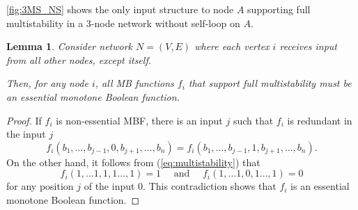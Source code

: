 \documentclass[12pt]{amsart}
\newtheorem{lem}[thm]{Lemma}
\theoremstyle{definition}
\begin{document}
\cref{fig:3MS_NS} shows the only input structure to node $A$ supporting full multistability in a 3-node network without self-loop on $A$.

\begin{lem}
    Consider network $N=(V,E)$ where each vertex $i$ receives input from all other nodes, except itself.
    
     Then, for any node $i$, all MB functions $f_i$ that support full multistability must be an essential monotone Boolean function.
\end{lem}

\begin{proof}
    If  $f_i$ is non-essential MBF, there is an input $j$ such that $f_i$ is redundant in the input $j$
    \[ f_i(b_1,\ldots,b_{j-1},0,b_{j+1},\ldots,b_n) = f_i(b_1,\ldots,b_{j-1},1,b_{j+1},\ldots,b_n).\]
On the other hand, it follows from (\ref{eq:multistability}) that 
\[ f_i(1,\ldots1,1,1\ldots,1) = 1 \quad \mbox{ and } \quad f_i(1,\ldots1,0,1\ldots,1) = 0 \]
for any position $j$ of the input $0$. This contradiction shows that $f_i$ is an essential monotone Boolean function.
\end{proof}
\end{document}
